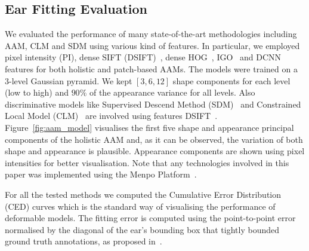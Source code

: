\subsection{Ear Fitting Evaluation}
\label{sec:ear_benchmark_fitting}

We evaluated the performance of many state-of-the-art methodologies including AAM, CLM and SDM using various kind of features. In particular, we employed pixel intensity (PI), dense SIFT (DSIFT)~\cite{lowe1999object}, dense HOG~\cite{Dalal2005}, IGO~\cite{tzimiropoulos2012subspace} and DCNN~\cite{sermanet2013overfeat} features for both holistic and patch-based AAMs. The models were trained on a 3-level Gaussian pyramid. We kept $[3, 6, 12]$ shape components for each level (low to high) and $90\%$ of the appearance variance for all levels. Also discriminative models like Supervised Descend Method (SDM)~\cite{xiong2013supervised} and Constrained Local Model (CLM)~\cite{cristinacce2006feature}  are involved using features DSIFT~\cite{lowe1999object}. Figure~\ref{fig:aam_model} visualises the first five shape and appearance principal components of the holistic AAM and, as it can be observed, the variation of both shape and appearance is plausible. Appearance components are shown using pixel intensities for better visualisation. Note that any technologies involved in this paper was implemented using the Menpo Platform~\cite{alabort2014menpo}.

For all the tested methods we computed the Cumulative Error Distribution (CED) curves which is the standard way of visualising the performance of deformable models. The fitting error is computed using the point-to-point error normalised by the diagonal of the ear's bounding box that tightly bounded ground truth annotations, as proposed in~\cite{Zhu2012}.


